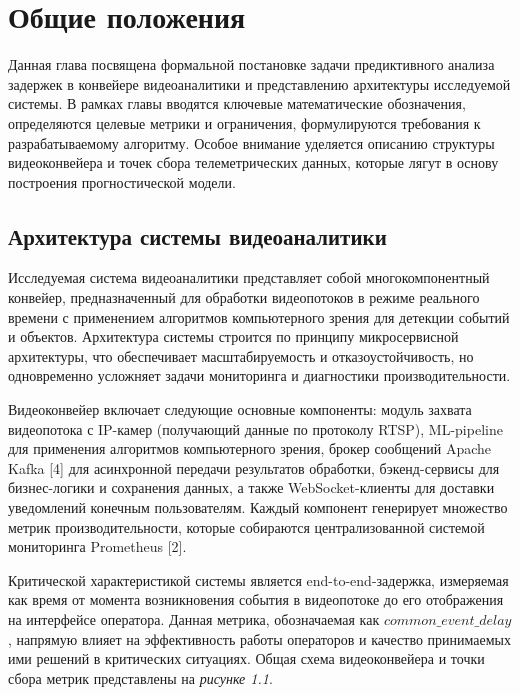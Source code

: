 \chapter{Общие положения}

\hspace*{1.25cm}Данная глава посвящена формальной постановке задачи предиктивного анализа задержек в конвейере видеоаналитики и представлению архитектуры исследуемой системы. В рамках главы вводятся ключевые математические обозначения, определяются целевые метрики и ограничения, формулируются требования к разрабатываемому алгоритму. Особое внимание уделяется описанию структуры видеоконвейера и точек сбора телеметрических данных, которые лягут в основу построения прогностической модели.

\section{Архитектура системы видеоаналитики}

\hspace*{1.25cm}Исследуемая система видеоаналитики представляет собой многокомпонентный конвейер, предназначенный для обработки видеопотоков в режиме реального времени с применением алгоритмов компьютерного зрения для детекции событий и объектов. Архитектура системы строится по принципу микросервисной архитектуры, что обеспечивает масштабируемость и отказоустойчивость, но одновременно усложняет задачи мониторинга и диагностики производительности.

\hspace*{1.25cm}Видеоконвейер включает следующие основные компоненты: модуль захвата видеопотока с IP-камер (получающий данные по протоколу RTSP), ML-pipeline для применения алгоритмов компьютерного зрения, брокер сообщений Apache Kafka [4] для асинхронной передачи результатов обработки, бэкенд-сервисы для бизнес-логики и сохранения данных, а также WebSocket-клиенты для доставки уведомлений конечным пользователям. Каждый компонент генерирует множество метрик производительности, которые собираются централизованной системой мониторинга Prometheus [2].

\hspace*{1.25cm}Критической характеристикой системы является end-to-end-задержка, измеряемая как время от момента возникновения события в видеопотоке до его отображения на интерфейсе оператора. Данная метрика, обозначаемая как $common\_event\_delay$, напрямую влияет на эффективность работы операторов и качество принимаемых ими решений в критических ситуациях. Общая схема видеоконвейера и точки сбора метрик представлены на \textit{рисунке 1.1}.

